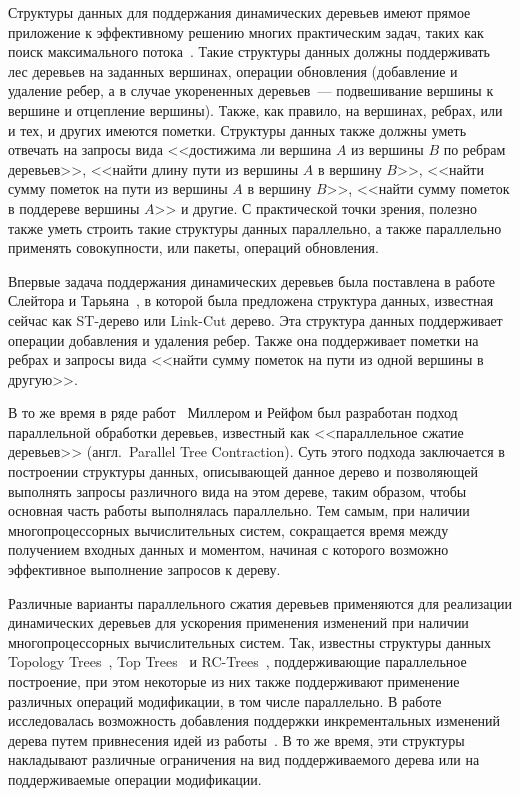 \documentclass[specification,annotation]{itmo-student-thesis}
\begin{document}

\tableofcontents

\startprefacepage

Структуры данных для поддержания динамических деревьев имеют прямое приложение к эффективному решению многих практическим задач,
таких как поиск максимального потока~\cite{goldberg88}. Такие структуры данных должны поддерживать лес деревьев на заданных вершинах,
операции обновления (добавление и удаление ребер, а в случае укорененных деревьев~--- подвешивание вершины к вершине и отцепление вершины).
Также, как правило, на вершинах, ребрах, или и тех, и других имеются пометки. Структуры данных также должны уметь отвечать на запросы
вида <<достижима ли вершина $A$ из вершины $B$ по ребрам деревьев>>, <<найти длину пути из вершины $A$ в вершину $B$>>,
<<найти сумму пометок на пути из вершины $A$ в вершину $B$>>, <<найти сумму пометок в поддереве вершины $A$>> и другие.
С практической точки зрения, полезно также уметь строить такие структуры данных параллельно,
а также параллельно применять совокупности, или пакеты, операций обновления.

Впервые задача поддержания динамических деревьев была поставлена в работе Слейтора и Тарьяна~\cite{sleator83}, в которой была предложена
структура данных, известная сейчас как ST-дерево или Link-Cut дерево. Эта структура данных поддерживает операции добавления и удаления ребер.
Также она поддерживает пометки на ребрах и запросы вида <<найти сумму пометок на пути из одной вершины в другую>>.

В то же время в ряде работ~\cite{miller85, miller89, miller91, reif94} Миллером и Рейфом был разработан подход параллельной обработки деревьев,
известный как <<параллельное сжатие деревьев>> (англ.~Parallel Tree Contraction). Суть этого подхода заключается в построении структуры данных,
описывающей данное дерево и позволяющей выполнять запросы различного вида на этом дереве, таким образом, чтобы основная часть работы выполнялась
параллельно. Тем самым, при наличии многопроцессорных вычислительных систем, сокращается время между получением входных данных и моментом, начиная
с которого возможно эффективное выполнение запросов к дереву.

Различные варианты параллельного сжатия деревьев применяются для реализации динамических деревьев для ускорения применения изменений при наличии
многопроцессорных вычислительных систем. Так, известны структуры данных Topology Trees~\cite{frederickson97}, Top Trees~\cite{alstrup05} и RC-Trees~\cite{acar03},
поддерживающие параллельное построение, при этом 
некоторые из них также поддерживают применение различных операций модификации, в том числе параллельно. 
В работе~\cite{acar04} исследовалась возможность добавления поддержки инкрементальных изменений дерева путем привнесения идей
из работы~\cite{miller85}. В то же время, эти структуры накладывают различные ограничения на вид поддерживаемого дерева или на поддерживаемые операции модификации.
\end{document}
